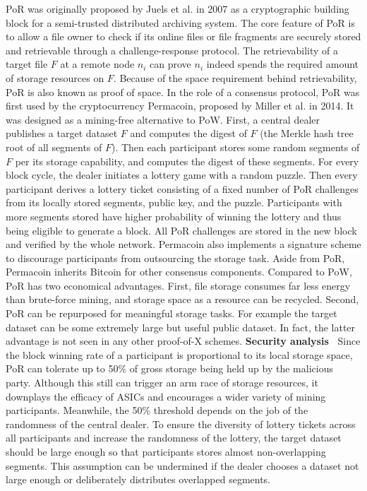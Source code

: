 PoR was originally proposed by Juels et al.  in 2007 as a cryptographic building block for a semi-trusted distributed archiving system. The core feature of PoR is to allow a file owner to check if its online files or file fragments are securely stored and retrievable through a challenge-response protocol. The retrievability of a target file $F$ at a remote node $n_i$ can prove $n_i$ indeed spends the required amount of storage resources on $F$. Because of the space requirement behind retrievability, PoR is also known as proof of space. 
In the role of a consensus protocol, PoR was first used by the cryptocurrency Permacoin, proposed by Miller et al.  in 2014. It was designed as a mining-free alternative to PoW. First, a central dealer publishes a target dataset $F$ and computes the digest of $F$ (the Merkle hash tree root of all segments of $F$). Then each participant stores some random segments of $F$ per its storage capability, and computes the digest of these segments. For every block cycle, the dealer initiates a lottery game with a random puzzle. Then every participant derives a lottery ticket consisting of a fixed number of PoR challenges from its locally stored segments, public key, and the puzzle. Participants with more segments stored have higher probability of winning the lottery and thus being eligible to generate a block. All PoR challenges are stored in the new block and verified by the whole network. Permacoin also implements a signature scheme to discourage participants from outsourcing the storage task. Aside from PoR, Permacoin inherits Bitcoin for other consensus components.
Compared to PoW, PoR has two economical advantages. First, file storage consumes far less energy than brute-force mining, and storage space as a resource can be recycled. Second, PoR can be repurposed for meaningful storage tasks. For example the target dataset can be some extremely large but useful public dataset. In fact, the latter advantage is not seen in any other proof-of-X schemes. 
\textbf{Security analysis~} Since the block winning rate of a participant is proportional to its local storage space, PoR can tolerate up to 50\% of gross storage being held up by the malicious party. Although this still can trigger an arm race of storage resources, it downplays the efficacy of ASICs and encourages a wider variety of mining participants. Meanwhile, the 50\% threshold depends on the job of the randomness of the central dealer. To ensure the diversity of lottery tickets across all participants and increase the randomness of the lottery, the target dataset should be large enough so that participants stores almost non-overlapping segments. This assumption can be undermined if the dealer chooses a dataset not large enough or deliberately distributes overlapped segments.

